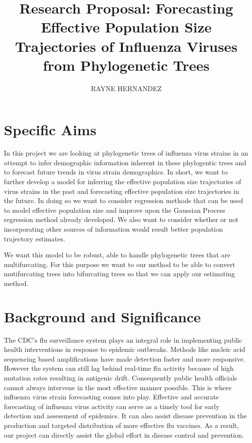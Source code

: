 \documentclass[10pt, oneside]{article}
\title{Research Proposal: Forecasting Effective Population Size Trajectories of Influenza Viruses from Phylogenetic Trees}
\author[1]{RAYNE HERNANDEZ}
\affil[ ]{Stanford University}
\date{}
\begin{document}
\maketitle

\section{Specific Aims}

In this project we are looking at phylogenetic trees of influenza virus strains in an attempt to infer demographic information inherent in these phylogentic trees and to forecast future trends in virus strain demographics. In short, we want to further develop a model for inferring the effective population size trajectories of virus strains in the past and forecasting effective population size trajectories in the future. In doing so we want to consider regression methods that can be used to model effective population size and improve upon the Gaussian Process regression method already developed. We also want to consider whether or not incorporating other sources of information would result better population trajectory estimates. 

We want this model to be robust, able to handle phylogenetic trees that are multifurcating. For this purpose we want to our method to be able to convert mutifurcating trees into bifurcating trees so that we can apply our estimating method. 

\section{Background and Significance}

The CDC's flu surveillance system plays an integral role in implementing public health interventions in response to epidemic outbreaks. Methods like nucleic acid sequencing based amplifications have made detection faster and more responsive. However the system can still lag behind real-time flu activity because of high mutation rates resulting in antigenic drift\cite{wang_2017}. Consequently public health officials cannot always intervene in the most effective manner possible. This is where influenza virus strain forecasting comes into play. Effective and accurate forecasting of influenza virus activity can serve as a timely tool for early detection and assessment of epidemics. It can also assist disease prevention in the production and targeted distribution of more effective flu vaccines. As a result, our project can directly assist the global effort in disease control and prevention. 
\end{document}
